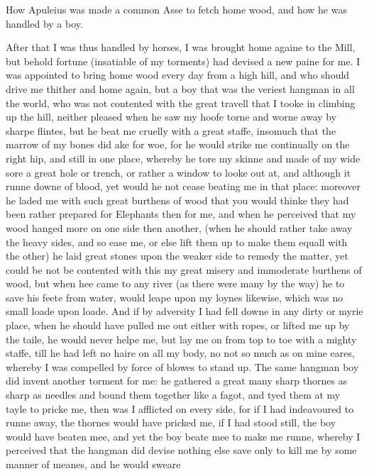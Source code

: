 
How Apuleius was made a common Asse to fetch home wood, and how he was handled
by a boy.

After that I was thus handled by horses, I was brought home againe to the Mill,
but behold fortune (insatiable of my torments) had devised a new paine for me.
I was appointed to bring home wood every day from a high hill, and who should
drive me thither and home again, but a boy that was the veriest hangman in all
the world, who was not contented with the great travell that I tooke in
climbing up the hill, neither pleased when he saw my hoofe torne and worne away
by sharpe flintes, but he beat me cruelly with a great staffe, insomuch that
the marrow of my bones did ake for woe, for he would strike me continually on
the right hip, and still in one place, whereby he tore my skinne and made of my
wide sore a great hole or trench, or rather a window to looke out at, and
although it runne downe of blood, yet would he not cease beating me in that
place: moreover he laded me with such great burthens of wood that you would
thinke they had been rather prepared for Elephants then for me, and when he
perceived that my wood hanged more on one side then another, (when he should
rather take away the heavy sides, and so ease me, or else lift them up to make
them equall with the other) he laid great stones upon the weaker side to remedy
the matter, yet could be not be contented with this my great misery and
immoderate burthens of wood, but when hee came to any river (as there were many
by the way) he to save his feete from water, would leape upon my loynes
likewise, which was no small loade upon loade. And if by adversity I had fell
downe in any dirty or myrie place, when he should have pulled me out either
with ropes, or lifted me up by the taile, he would never helpe me, but lay me
on from top to toe with a mighty staffe, till he had left no haire on all my
body, no not so much as on mine eares, whereby I was compelled by force of
blowes to stand up. The same hangman boy did invent another torment for me: he
gathered a great many sharp thornes as sharp as needles and bound them together
like a fagot, and tyed them at my tayle to pricke me, then was I afflicted on
every side, for if I had indeavoured to runne away, the thornes would have
pricked me, if I had stood still, the boy would have beaten mee, and yet the
boy beate mee to make me runne, whereby I perceived that the hangman did devise
nothing else save only to kill me by some manner of meanes, and he would sweare
